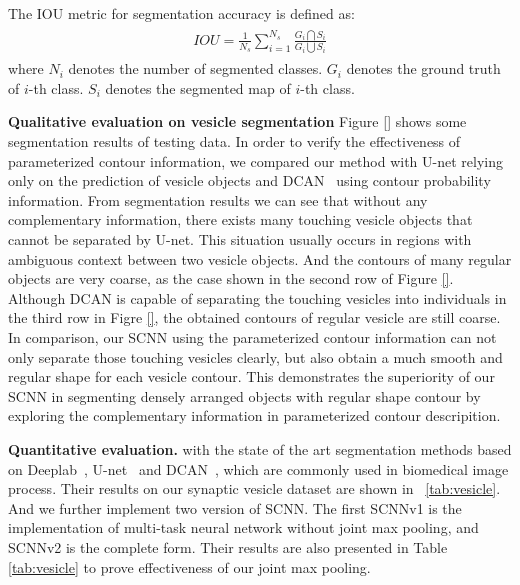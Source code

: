 The IOU metric for segmentation accuracy is defined as:
%
\begin{eqnarray}\label{fusion}
\begin{aligned}
IOU = \frac{1}{N_s}\sum_{i=1}^{N_s}\frac{G_i\bigcap S_i}{G_i\bigcup S_i}
\end{aligned}
\end{eqnarray}
%
where $N_i$ denotes the number of segmented classes.
$G_i$ denotes the ground truth of $i$-th class.
$S_i$ denotes the segmented map of $i$-th class.

\noindent\textbf{Qualitative evaluation on vesicle segmentation}
Figure \ref{} shows some segmentation results of testing data.
In order to verify the effectiveness of parameterized contour information, we compared our method with U-net \cite{Ronneberger2015} relying only on the prediction of vesicle objects and DCAN~\cite{Chen2016a} using contour probability information.
%
From segmentation results we can see that without any complementary information, there exists many touching vesicle objects that cannot be separated by U-net.
%
This situation usually occurs in regions with ambiguous context between two vesicle objects.
And the contours of many regular objects are very coarse, as the case shown in the second row of Figure \ref{}.
Although DCAN is capable of separating the touching vesicles into individuals in the third row in Figre \ref{}, the obtained contours of regular vesicle are still coarse.
In comparison, our SCNN using the parameterized contour information can not only separate those touching vesicles clearly, but also obtain a much smooth and regular shape for each vesicle contour.
This demonstrates the superiority of our SCNN in segmenting densely arranged objects with regular shape contour by exploring the complementary information in parameterized contour descripition.


\noindent\textbf{Quantitative evaluation.}
 with the state of the art segmentation methods based on Deeplab~\cite{Chen2014a}, U-net~\cite{Ronneberger2015} and DCAN~\cite{Chen2016b}, which are commonly used in biomedical image process.
%
Their results on our synaptic vesicle dataset are shown in ~\ref{tab:vesicle}.
%
And we further implement two version of SCNN.
The first SCNNv1 is the implementation of multi-task neural network without joint max pooling, and SCNNv2 is the complete form.
Their results are also presented in Table \ref{tab:vesicle} to prove effectiveness of our joint max pooling.

